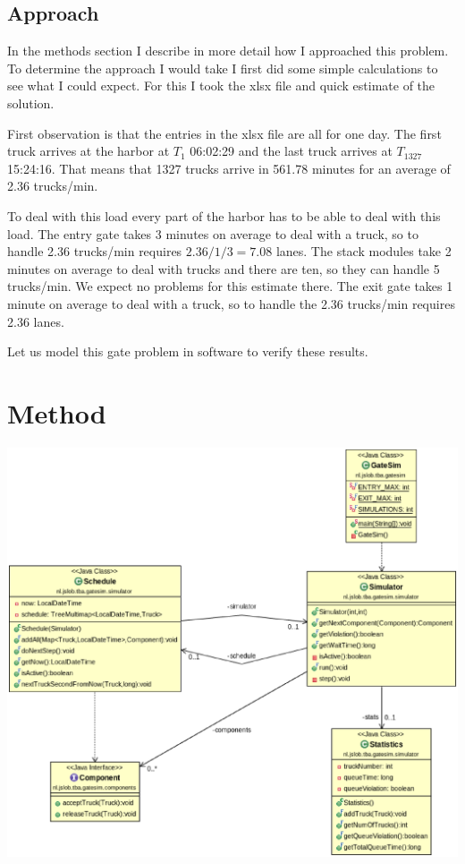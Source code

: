 \documentclass{article}
\begin{document}
\subsection{Approach}

In the methods section I describe in more detail how I approached this
problem. To determine the approach I would take I first did some
simple calculations to see what I could expect. For this I took the
xlsx file and quick estimate of the solution.

First observation is that the entries in the xlsx file are all for one
day. The first truck arrives at the harbor at $T_1$ 06:02:29 and the
last truck arrives at $T_{1327}$ 15:24:16. That means that 1327 trucks
arrive in 561.78 minutes for an average of 2.36 trucks/min.

To deal with this load every part of the harbor has to be able to deal
with this load. The entry gate takes 3 minutes on average to deal with
a truck, so to handle 2.36 trucks/min requires $2.36 / 1/3 = 7.08$
lanes. The stack modules take 2 minutes on average to deal with trucks
and there are ten, so they can handle 5 trucks/min. We expect no
problems for this estimate there. The exit gate takes 1 minute on
average to deal with a truck, so to handle the 2.36 trucks/min
requires 2.36 lanes.

Let us model this gate problem in software to verify these results.

\section{Method}

\includegraphics[scale=0.4]{Simulator.eps}
\end{document}
